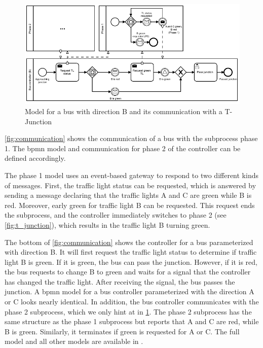 \documentclass{jot}
\begin{document}
\begin{figure}[ht]
    \centering
    \includegraphics[width=1\textwidth]{figures/communication.pdf}
    \caption{Model for a bus with direction B and its communication with a T-Junction}
    \label{fig:communication}
\end{figure}

\autoref{fig:communication} shows the communication of a bus with the subprocess phase 1.
The \gls*{bpmn} model and communication for phase 2 of the controller can be defined accordingly.

The phase 1 model uses an event-based gateway to respond to two different kinds of messages.
First, the traffic light status can be requested, which is answered by sending a message declaring that the traffic lights A and C are green while B is red.
Moreover, early green for traffic light B can be requested.
This request ends the subprocess, and the controller immediately switches to phase 2 (see \cref{fig:t_junction}), which results in the traffic light B turning green.

The bottom of \autoref{fig:communication} shows the controller for a bus parameterized with direction B.
It will first request the traffic light status to determine if traffic light B is green.
If it is green, the bus can pass the junction.
However, if it is red, the bus requests to change B to green and waits for a signal that the controller has changed the traffic light.
After receiving the signal, the bus passes the junction.
A \gls*{bpmn} model for a bus controller parameterized with the direction A or C looks nearly identical.
In addition, the bus controller communicates with the phase 2 subprocess, which we only hint at in \cref{fig:communication}.
The phase 2 subprocess has the same structure as the phase 1 subprocess but reports that A and C are red, while B is green.
Similarly, it terminates if green is requested for A or C.
The full model and all other models are available in \cite{krauterArtifactsBehavioralConsistency2023}.
\end{document}
